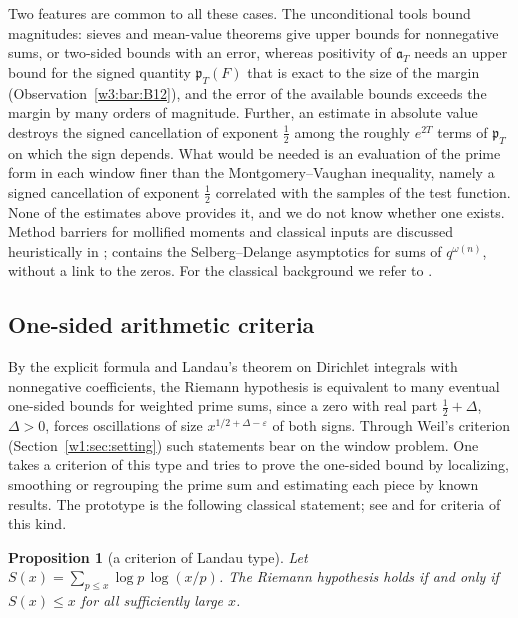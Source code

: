 \documentclass[11pt]{amsart}
\newtheorem{proposition}[theorem]{Proposition}
\theoremstyle{definition}
\theoremstyle{remark}
\numberwithin{equation}{section}
\newcommand{\pT}{\mathfrak{p}_T}                       %
\newcommand{\aT}{\mathfrak{a}_T}                       %
\begin{document}
Two features are common to all these cases. The unconditional tools bound magnitudes: sieves and mean-value
theorems give upper bounds for nonnegative sums, or two-sided bounds with an error, whereas positivity of $\aT$
needs an upper bound for the signed quantity $\pT(F)$ that is exact to the size of the margin
(Observation~\ref{w3:bar:B12}), and the error of the available bounds exceeds the margin by many orders of
magnitude. Further, an estimate in absolute value destroys the signed cancellation of exponent $\frac12$ among
the roughly $e^{2T}$ terms of $\pT$ on which the sign depends. What would be needed is an evaluation of the
prime form in each window finer than the Montgomery--Vaughan inequality, namely a signed cancellation of
exponent $\frac12$ correlated with the samples of the test function. None of the estimates above provides it,
and we do not know whether one exists. Method barriers for mollified moments and classical inputs are discussed
heuristically in \cite{P33,P34}; \cite{P21} contains the Selberg--Delange asymptotics for sums of
$q^{\omega(n)}$, without a link to the zeros. For the classical background we refer to
\cite{Ingham1932,Titchmarsh1986}.

\subsection{One-sided arithmetic criteria}\label{w7:fam:R18}

By the explicit formula and Landau's theorem on Dirichlet integrals with nonnegative coefficients, the Riemann
hypothesis is equivalent to many eventual one-sided bounds for weighted prime sums, since a zero with real
part $\frac12+\Delta$, $\Delta>0$, forces oscillations of size $x^{1/2+\Delta-\varepsilon}$ of both signs.
Through Weil's criterion (Section~\ref{w1:sec:setting}) such statements bear on the window problem. One takes
a criterion of this type and tries to prove the one-sided bound by localizing, smoothing or regrouping the
prime sum and estimating each piece by known results. The prototype is the following classical statement; see
\cite[Ch.~V]{Ingham1932} and \cite[Ch.~XIV]{Titchmarsh1986} for criteria of this kind.

\begin{proposition}[a criterion of Landau type]\label{w7:prop:landau}
Let $S(x)=\sum_{p\le x}\log p\,\log(x/p)$. The Riemann hypothesis holds if and only if $S(x)\le x$ for all
sufficiently large $x$.
\end{proposition}
\end{document}

